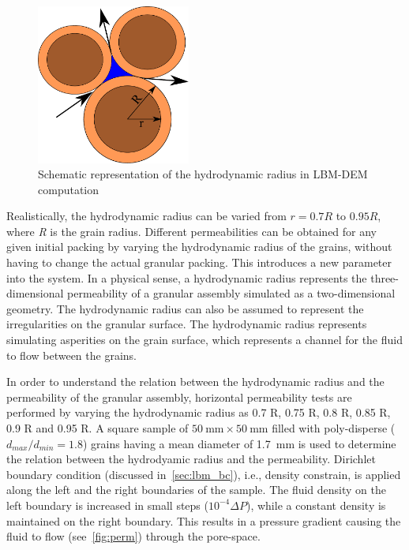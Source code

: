 \begin{figure}[htpb]
\centering
\includegraphics[width=0.45\textwidth]{reduction}
\caption{Schematic representation of the hydrodynamic radius in LBM-DEM 
computation}
\label{fig:reduction}
\end{figure}

Realistically, the hydrodynamic radius can be varied from $ r = 0.7 R$ to 
$0.95R$, where \textit{R} is the grain radius. Different permeabilities can be 
obtained for any given initial packing by varying the hydrodynamic radius of 
the grains, without having to change the actual granular packing. This 
introduces a new parameter into the system. In a physical sense, a 
hydrodynamic radius represents the three-dimensional permeability of a 
granular assembly simulated as a two-dimensional geometry. The hydrodynamic 
radius can also be assumed to represent the irregularities on the granular 
surface. The hydrodynamic radius represents simulating asperities on 
the grain surface, which represents a channel for the fluid to flow between the 
grains. 

In order to understand the relation between the hydrodynamic radius and the 
permeability of the granular assembly, horizontal permeability tests are 
performed by varying the hydrodynamic radius as 0.7 R, 0.75 R, 0.8 R, 0.85 R, 
0.9 R and 0.95 R. A square sample of 
$50~\si{\mm} 
\times 50~\si{\mm}$ filled with poly-disperse ($d_{max}/d_{min} = 1.8$) grains 
having a mean diameter of 1.7~\si{\mm} is used to determine the relation 
between the hydrodyamic radius and the permeability. Dirichlet boundary 
condition (discussed in~\cref{sec:lbm_bc}), i.e., density constrain,  
is applied along the left and the right boundaries of the sample. The fluid 
density on the left boundary is increased in small steps ($10^{-4} \Delta P$), 
while a constant density is maintained on the right boundary. This results in a 
pressure gradient causing 
the fluid to flow (see~\cref{fig:perm}) through the pore-space. 

